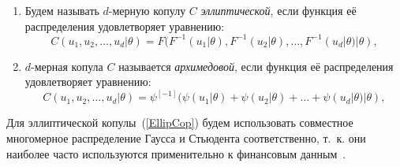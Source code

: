 \begin{enumerate}[label=(\arabic*),labelwidth=1cm,leftmargin=1cm]
\item 
Будем называть $d$-мерную копулу $C$ \textit{эллиптической}, если функция её распределения удовлетворяет уравнению:
\begin{equation} \label{EllipCop}
    C(u_1, u_2, \ldots,u_d|\theta) = F(F^{-1}(u_1|\theta),F^{-1}(u_2|\theta), \ldots,F^{-1}(u_d|\theta)|\theta),
\end{equation}
\item $d$-мерная копула $C$ называется \textit{архимедовой}, если функция её распределения удовлетворяет уравнению:
\begin{equation} \label{ArchCop}
    C(u_1,u_2,\ldots,u_d|\theta) = \psi^{[-1]}(\psi(u_1|\theta)+\psi(u_2|\theta) + \ldots + \psi(u_d|\theta) | \theta ),
\end{equation}
\end{enumerate}

Для эллиптической копулы~(\ref{EllipCop}) будем использовать совместное многомерное распределение Гаусса и Стьюдента соответственно, т.~к. они наиболее часто используются применительно к финансовым данным~\cite{Lourme2016}.

